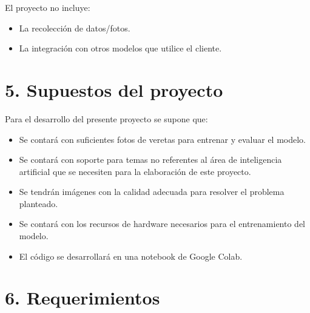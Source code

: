 \documentclass[
11pt, %
]{charter}
\begin{document}
El proyecto no incluye:
\begin{itemize}
	\item La recolección de datos/fotos.
	\item La integración con otros modelos que utilice el cliente.
\end{itemize}

\section{5. Supuestos del proyecto}
\label{sec:supuestos}
Para el desarrollo del presente proyecto se supone que:
\begin{itemize}
	\item Se contará con suficientes fotos de veretas para entrenar y evaluar el modelo. 
	\item Se contará con soporte para temas no referentes al área de inteligencia artificial que se necesiten para la elaboración de este proyecto.
	\item Se tendrán imágenes con la calidad adecuada para resolver el problema planteado.
	\item Se contará con los recursos de hardware necesarios para el entrenamiento del modelo.
	\item El código se desarrollará en una notebook de Google Colab.
\end{itemize}

\section{6. Requerimientos}
\label{sec:requerimientos}
\end{document}
